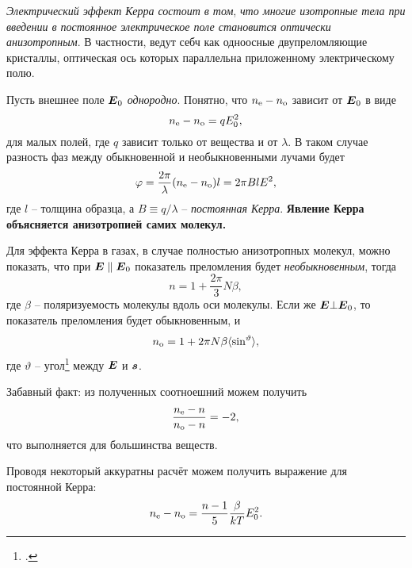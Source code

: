 

\textit{Электрический эффект Керра состоит в том}, \textit{что многие изотропные тела при введении в постоянное электрическое поле становится оптически анизотропным}. В частности, ведут себч как одноосные двупреломляющие кристаллы, оптическая ось которых параллельна приложенному электрическому полю. 


Пусть внешнее поле $\mbox{\boldmath $E$}_0$ \textit{однородно}. Понятно, что $n_{\textnormal{e}}-n_{\textnormal{o}}$ зависит от $\mbox{\boldmath $E$}_0$ в виде
\begin{equation*}
    n_{\textnormal{e}} - n_{\textnormal{o}} = q E_0^2,
\end{equation*}
для малых полей, где $q$ зависит только от вещества и от $\lambda$. В таком случае разность фаз между обыкновенной и необыкновенными лучами будет
\begin{equation*}
    \varphi = \frac{2\pi}{\lambda}(n_{\textnormal{e}} - n_{\textnormal{o}}) l = 2 \pi B l E^2,
\end{equation*}
где $l$ -- толщина образца, а $B \equiv q/\lambda$ -- \textit{постоянная Керра}. \textbf{Явление Керра объясняется анизотропией самих молекул.} 

Для эффекта Керра в газах, в случае полностью анизотропных молекул, можно показать, что при $\mbox{\boldmath $E$} \parallel \mbox{\boldmath $E$}_0$ показатель преломления будет \textit{необыкновенным}, тогда
\begin{equation*}
    n = 1 + \frac{2\pi}{3} N \beta,
\end{equation*}
где $\beta$ -- поляризуемость молекулы вдоль оси молекулы. Если же $\mbox{\boldmath $E$} \bot \mbox{\boldmath $E$}_0$, то  показатель преломления будет обыкновенным, и
\begin{equation*}
    n_{\textnormal{o}} = 1 + 2 \pi N \beta \langle \sin^ \vartheta \rangle,
\end{equation*}
где $\vartheta$ -- угол\footnote{
    .
}  между $\mbox{\boldmath $E$}$ и $\mbox{\boldmath $s$}$.

Забавный факт: из полученных соотноешний можем получить
\begin{equation*}
    \frac{n_{\textnormal{e}}-n}{n_{\textnormal{o}}-n} = -2,
\end{equation*}
что выполняется для большинства веществ. 


Проводя некоторый аккуратны расчёт можем получить выражение для постоянной Керра:
\begin{equation*}
    n_{\textnormal{e}} - n_{\textnormal{o}} = \frac{n-1}{5} \frac{\beta}{kT} E_0^2.
\end{equation*}
